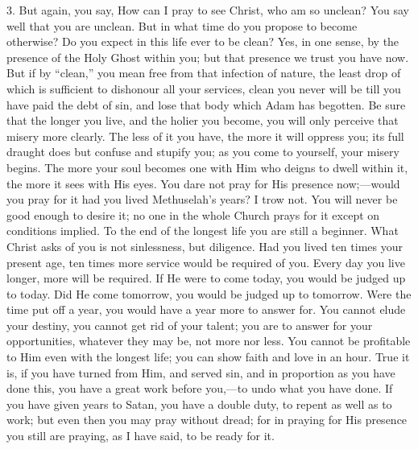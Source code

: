 3. But again, you say, How can I pray to see Christ, who am so
unclean? You say well that you are unclean. But in what time do you
propose to become otherwise? Do you expect in this life ever to be
clean? Yes, in one sense, by the presence of the Holy Ghost within
you; but that presence we trust you have now. But if by
``clean,'' you mean free from that infection of nature, the
least drop of which is sufficient to dishonour all your services,
clean you never will be till you have paid the debt of sin, and lose
that body which Adam has begotten. Be sure that the longer you live,
and the holier you become, you will only perceive that misery more
clearly. The less of it you have, the more it will oppress you; its
full draught does but confuse and stupify you; as you come to
yourself, your misery begins. The more your soul becomes one with Him
who deigns to dwell within it, the more it sees with His eyes. You
dare not pray for His presence now;—would you pray for it had you
lived Methuselah's years? I trow not. You will never be good enough to
desire it; no one in the whole Church prays for it except on
conditions implied. To the end of the longest life you are still a
beginner. What Christ asks of you is not sinlessness, but diligence.
Had you lived ten times your present age, ten times more service would
be required of you. Every day you live longer, more will be required.
If He were to come today, you would be judged up to today. Did He come
tomorrow, you would be judged up to tomorrow. Were the time put off a
year, you would have a year more to answer for. You cannot elude your
destiny, you cannot get rid of your talent; you are to answer for your
opportunities, whatever they may be, not more nor less. You cannot be
profitable to Him even with the longest life; you can show faith and
love in an hour. True it is, if you have turned from Him, and served
sin, and in proportion as you have done this, you have a great work
before you,—to undo what you have done. If you have given years to
Satan, you have a double duty, to repent as well as to work; but even
then you may pray without dread; for in praying for His presence you
still are praying, as I have said, to be ready for it.

